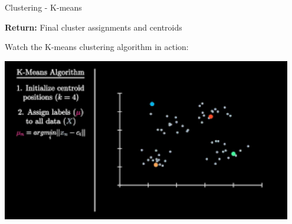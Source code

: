 \begin{frame}[allowframebreaks]{Clustering - K-means}
\begin{algorithm}[H]
\vspace{0.8em}

\textbf{Return:} Final cluster assignments and centroids\;
\vspace{0.8em}

\end{algorithm}

\framebreak

\begin{center}
    Watch the K-means clustering algorithm in action:

    \vspace{1em}

    \href{https://www.youtube.com/watch?v=2lZZ_FzlIJY}{%
    \includegraphics[width=0.95\textwidth,keepaspectratio]{images/thumbnails/k-means-youtube-thumbnail-0.png}
    }
\end{center}

\framebreak


\end{frame}
